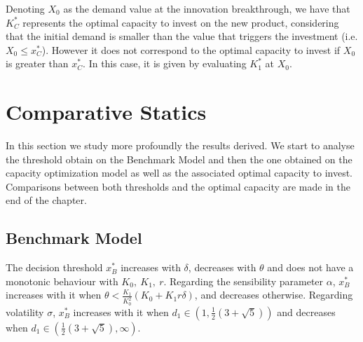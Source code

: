 Denoting $X_0$ as the demand value at the innovation breakthrough, we have that $K^*_C$ represents the optimal capacity to invest on the new product, considering that the initial demand is smaller than the value that triggers the investment (i.e. $X_0 \leq x^*_C$). However it does not correspond to the optimal capacity to invest if $X_0$ is greater than $x_C^*$. In this case, it is given by evaluating $K^*_1$ at $X_0$.












\section{Comparative Statics}

In this section we study more profoundly the results derived.
We start to analyse the threshold obtain on the Benchmark Model and then the one obtained on the capacity optimization model as well as the associated optimal capacity to invest. Comparisons between both thresholds and the optimal capacity are made in the end of the chapter.

\subsection{Benchmark Model}
\label{2_bm}


\begin{prop}
	\label{2_prop1}
The decision threshold $x^*_B$ increases with $ \delta$, decreases with $\theta$ and does not have a monotonic behaviour with $K_0, \ K_1, \ r$. Regarding the sensibility parameter $\alpha$, $x_B^*$ increases with it when $\theta < \frac{K_1}{ K_0^2} (K_0+K_1 r \delta)$, and decreases otherwise. Regarding volatility $\sigma$,  $x_B^*$ increases with it when $d_1 \in (1,\frac{1}{2} (3+\sqrt{5}))$ and decreases when $d_1 \in \left(\frac{1}{2} (3+\sqrt{5}), \infty \right)$.
\end{prop}

